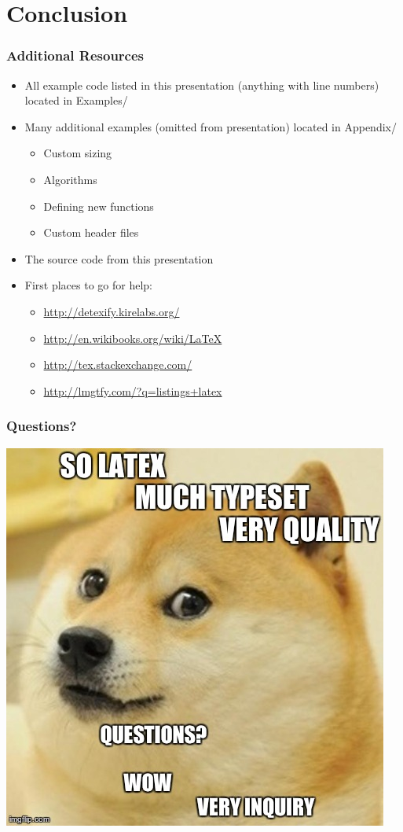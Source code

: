 \documentclass[notes=only]{beamer}
\begin{document}
\section{Conclusion}

\begin{frame}\frametitle{Additional Resources}
\begin{itemize}
\item All example code listed in this presentation (anything with line numbers) located in Examples/
\item Many additional examples (omitted from presentation) located in Appendix/
	\begin{itemize}
		\item Custom sizing
		\item Algorithms
		\item Defining new functions
		\item Custom header files
	\end{itemize}
\item The source code from this presentation	
\item First places to go for help:\\
\begin{itemize}
\item \url{http://detexify.kirelabs.org/}
\item \url{http://en.wikibooks.org/wiki/LaTeX}
\item \url{http://tex.stackexchange.com/}
\item \url{http://lmgtfy.com/?q=listings+latex}
\end{itemize}
\end{itemize}
\end{frame}

\begin{frame} \frametitle{Questions?}
\begin{center}
	\includegraphics[width=.7\textwidth]{Resources/doge.jpg}
	\end{center}
\end{frame}
\end{document}
